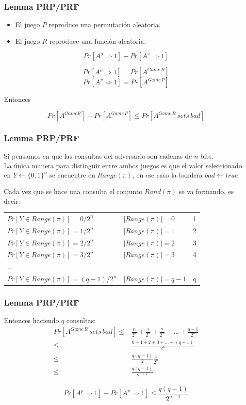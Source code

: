 \documentclass{beamer}
\newcommand{\binStr}{\{0,1\}}
\begin{document}
\frame
{
	\frametitle{Lemma PRP/PRF}
	
	\begin{itemize}
	\item El juego $P$ reproduce una permutación aleatoria.\\
	\item El juego $R$ reproduce una función aleatoria.\\
\end{itemize}		
	
	$$Pr\left[ A^{\rho}\Rightarrow 1\right] -
	         Pr\left[ A^{\pi} \Rightarrow 1\right] $$
	         
	$$Pr\left[ A^{\rho}\Rightarrow 1\right] = Pr[A^{Game\,R}] $$
	$$Pr\left[ A^{\pi }\Rightarrow 1\right] = Pr[A^{Game\,P}] $$
	
	Entonces
	
	$$ Pr\left[A^{Game R}\right] - Pr\left[A^{Game\,P}\right] \leq Pr\left[A^{Game\,R}\,sets\,bad\right]$$ 
}

\frame 
{
	\frametitle{Lemma PRP/PRF}

Si pensamos en que las consultas del adversario son cadenas de $n$ bits.\\

La única manera para distinguir entre ambos juegos es que el valor seleccionado en $Y\leftarrow \binStr^n$ se encuentre en $Range(\pi)$, en ese caso la bandera $bad\leftarrow true$.

Cada vez que se hace una consulta el conjunto $Rand(\pi)$ se va formando, es decir:\\
\vspace{0.5cm}
\begin{tabular}{lll}
$Pr[Y \in Range(\pi)]=0/2^n$ & $|Range(\pi)|=0$ & 1\\
$Pr[Y \in Range(\pi)]=1/2^n$ & $|Range(\pi)|=1$ & 2\\
$Pr[Y \in Range(\pi)]=2/2^n$ & $|Range(\pi)|=2$ & 3\\
$Pr[Y \in Range(\pi)]=3/2^n$ & $|Range(\pi)|=3$ & 4\\
... & & \\
$Pr[Y \in Range(\pi)]=(q-1)/2^n$ & $|Range(\pi)|=q-1$ & q\\

\end{tabular}


}

\frame 
{
	\frametitle{Lemma PRP/PRF}
	
	Entonces haciendo $q$ consultas:\\
	
	\begin{align*}
	Pr\left[A^{Game\,R}\,sets\,bad\right]\leq&\frac{0}{2^n}+\frac{1}{2^n}+\frac{2}{2^n}+...+\frac{q-1}{2^n}\\
	\leq & \frac{0+1+2+3+...+(q+1)}{2^n}\\
	\leq & \frac{q(q-1)}{2}\frac{1}{2^n}\\
	\leq & \frac{q(q-1)}{2^{n+1}}
	\end{align*}
	
	$$Pr\left[ A^{\rho}\Rightarrow 1\right] -
	         Pr\left[ A^{\pi} \Rightarrow 1\right] \leq \frac{q(q-1)}{2^{n+1}} $$
}
\end{document}

